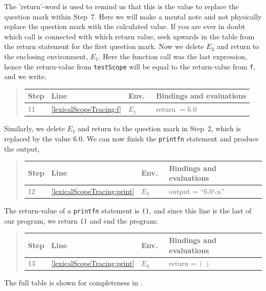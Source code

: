 \documentclass[fsharpNotes.tex]{subfiles}
\begin{document}
The 'return'-word is used to remind us that this is the value to replace the question mark within Step~7. Here we will make a mental note and not physically replace the question mark with the calculated value. If you are ever in doubt which call is connected with which return value, seek upwards in the table from the return statement for the first question mark. Now we delete $E_2$ and return to the enclosing environment, $E_1$. Here the function call was the last expression, hence the return-value from \lstinline{testScope} will be equal to the return-value from \lstinline{f}, and we write,
\begin{quote}
  \begin{tabular*}{0.9\linewidth}{l|lll}
    Step & Line & Env.\ & Bindings and evaluations\\
    \hline
    11 & \ref{lexicalScopeTracing:f} & $E_1$ & return $= 6.0$
  \end{tabular*}
\end{quote}
Similarly, we delete $E_1$ and return to the question mark in Step~2, which is replaced by the value $6.0$. We can now finish the \lstinline{printfn} statement and produce the output,
\begin{quote}
  \begin{tabular*}{0.9\linewidth}{l|lll}
    Step & Line & Env.\ & Bindings and evaluations\\
    \hline
    12 & \ref{lexicalScopeTracing:print} & $E_0$ & output = ``6.0$\backslash$n'' 
  \end{tabular*}
\end{quote}
The return-value of a \lstinline{printfn} statement is \lstinline{()}, and since this line is the last of our program, we return \lstinline{()} and end the program:
\begin{quote}
  \begin{tabular*}{0.9\linewidth}{l|lll}
    Step & Line & Env.\ & Bindings and evaluations\\
    \hline
    13 &\ref{lexicalScopeTracing:print} & $E_0$ & $\text{return} = ()$
  \end{tabular*}
\end{quote}
The full table is shown for completeness in .
\end{document}
